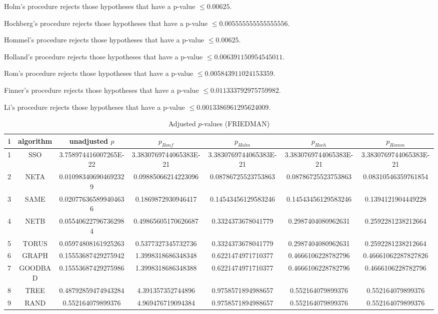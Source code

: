 \documentclass[a4paper,10pt]{article}
\begin{document}
\begin{landscape}
Holm's procedure rejects those hypotheses that have a p-value $\le0.00625$.


Hochberg's procedure rejects those hypotheses that have a p-value $\le0.005555555555555556$.


Hommel's procedure rejects those hypotheses that have a p-value $\le0.00625$.


Holland's procedure rejects those hypotheses that have a p-value $\le0.006391150954545011$.


Rom's procedure rejects those hypotheses that have a p-value $\le0.005843911024153359$.


Finner's procedure rejects those hypotheses that have a p-value $\le0.011333792975759982$.


Li's procedure rejects those hypotheses that have a p-value $\le0.0013386961295624009$.



\newpage

\begin{table}[!htp]
\centering\scriptsize
\caption{Adjusted $p$-values (FRIEDMAN)}
\begin{tabular}{ccccccc}
i&algorithm&unadjusted $p$&$p_{Bonf}$&$p_{Holm}$&$p_{Hoch}$&$p_{Homm}$\\
\hline
1& SSO&3.758974416007265E-22&3.3830769744065383E-21&3.3830769744065383E-21&3.3830769744065383E-21&3.3830769744065383E-21\\
2& NETA&0.010983406904692329&0.09885066214223096&0.08786725523753863&0.08786725523753863&0.08310546359761854\\
3& SAME&0.020776365899404636&0.1869872930946417&0.14543456129583246&0.14543456129583246&0.1394121904449228\\
4& NETB&0.055406227967362984&0.49865605170626687&0.3324373678041779&0.2987404080962631&0.2592281238212664\\
5& TORUS&0.05974808161925263&0.5377327345732736&0.3324373678041779&0.2987404080962631&0.2592281238212664\\
6& GRAPH&0.15553687429275942&1.3998318686348348&0.6221474971710377&0.4666106228782796&0.46661062287827826\\
7& GOODBAD&0.15553687429275986&1.3998318686348388&0.6221474971710377&0.4666106228782796&0.4666106228782796\\
8& TREE&0.48792859474943284&4.391357352744896&0.9758571894988657&0.552164079899376&0.552164079899376\\
9& RAND&0.552164079899376&4.969476719094384&0.9758571894988657&0.552164079899376&0.552164079899376\\
\hline
\end{tabular}
\end{table}


\end{landscape}
\end{document}
